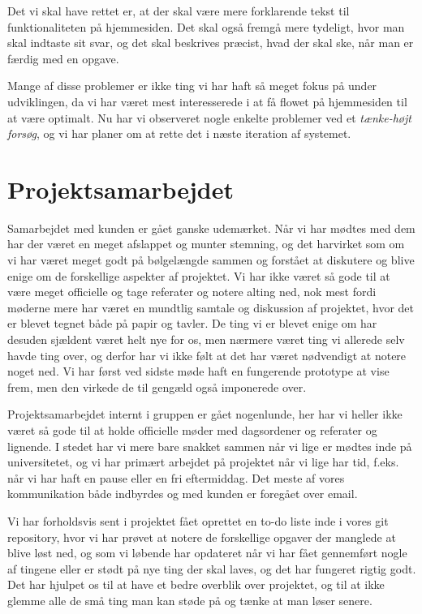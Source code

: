 \documentclass[11pt, a4paper]{article}
\begin{document}
Det vi skal have rettet er, at der skal være mere forklarende tekst til funktionaliteten på hjemmesiden. Det skal også fremgå mere tydeligt, hvor man skal indtaste sit svar, og det skal beskrives præcist, hvad der skal ske, når man er færdig med en opgave.

Mange af disse problemer er ikke ting vi har haft så meget fokus på under udviklingen, da vi har været mest interesserede i at få flowet på hjemmesiden til at være optimalt. Nu har vi observeret nogle enkelte problemer ved et \emph{tænke-højt forsøg}, og vi har planer om at rette det i næste iteration af systemet.

\section{Projektsamarbejdet}
\label{sec:projektsamarbejdet}
Samarbejdet med kunden er gået ganske udemærket. Når vi har mødtes med dem har der været en meget afslappet og munter stemning, og det harvirket som om vi har været meget godt på bølgelængde sammen og forstået at diskutere og blive enige om de forskellige aspekter af projektet. Vi har ikke været så gode til at være meget officielle og tage referater og notere alting ned, nok mest fordi møderne mere har været en mundtlig samtale og diskussion af projektet, hvor det er blevet tegnet både på papir og tavler. De ting vi er blevet enige om har desuden sjældent været helt nye for os, men nærmere været ting vi allerede selv havde ting over, og derfor har vi ikke følt at det har været nødvendigt at notere noget ned. Vi har først ved sidste møde haft en fungerende prototype at vise frem, men den virkede de til gengæld også imponerede over.

Projektsamarbejdet internt i gruppen er gået nogenlunde, her har vi heller ikke været så gode til at holde officielle møder  med dagsordener og referater og lignende. I stedet har vi mere bare snakket sammen når vi lige er mødtes inde på universitetet, og vi har primært arbejdet på projektet når vi lige har tid, f.eks. når vi har haft en pause eller en fri eftermiddag. Det meste af vores kommunikation både indbyrdes og med kunden er foregået over email.

Vi har forholdsvis sent i projektet fået oprettet en to-do liste inde i vores git repository, hvor vi har prøvet at notere de forskellige opgaver der manglede at blive løst ned, og som vi løbende har opdateret når vi har fået gennemført nogle af tingene eller er stødt på nye ting der skal laves, og det har fungeret rigtig godt. Det har hjulpet os til at have et bedre overblik over projektet, og til at ikke glemme alle de små ting man kan støde på og tænke at man løser senere.
\end{document}
